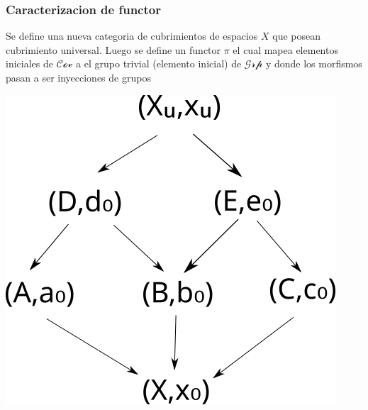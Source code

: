 \documentclass[xetex,mathserif,serif]{beamer}
\begin{document}
  \begin{frame}
    \frametitle{Caracterizacion de functor}
    \begin{block}{}
      Se define una nueva categoria de cubrimientos de espacios \(X\)
      que posean cubrimiento universal. Luego se define un functor
      \(\pi\) el cual mapea elementos iniciales de \(\mathscr{Cov}\) a
      el grupo trivial (elemento inicial) de \(\mathscr{Grp}\) y donde
      los morfismos pasan a ser inyecciones de grupos
    \end{block}
    \begin{block}{}
        \centering
        \includegraphics[scale=0.3]{../tesis/imagenes/cov.png}
      \end{block}
  \end{frame}
\end{document}
